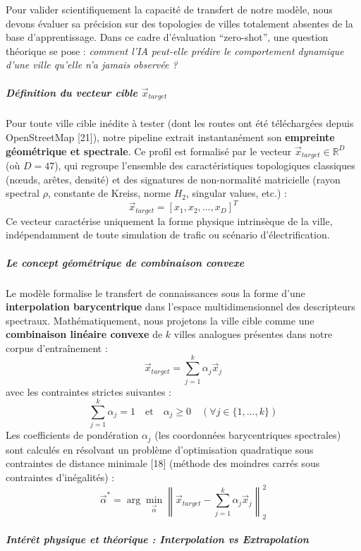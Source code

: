 \documentclass[10pt, a4paper]{article}
\begin{document}
Pour valider scientifiquement la capacité de transfert de notre modèle,
nous devons évaluer sa précision sur des topologies de villes totalement
absentes de la base d'apprentissage. Dans ce cadre d'évaluation
``zero-shot'', une question théorique se pose : \emph{comment l'IA
peut-elle prédire le comportement dynamique d'une ville qu'elle n'a
jamais observée ?}

\subparagraph{\texorpdfstring{Définition du vecteur cible
\(\vec{x}_{target}\)}{Définition du vecteur cible \textbackslash vec\{x\}\_\{target\}}}\label{duxe9finition-du-vecteur-cible-vecx_target}

Pour toute ville cible inédite à tester (dont les routes ont été
téléchargées depuis OpenStreetMap {[}21{]}), notre pipeline extrait
instantanément son \textbf{empreinte géométrique et spectrale}. Ce
profil est formalisé par le vecteur
\(\vec{x}_{target} \in \mathbb{R}^D\) (où \(D = 47\)), qui regroupe
l'ensemble des caractéristiques topologiques classiques (nœuds, arêtes,
densité) et des signatures de non-normalité matricielle (rayon spectral
\(\rho\), constante de Kreiss, norme \(H_2\), singular values, etc.) :
\[\vec{x}_{target} = [x_1, x_2, \dots, x_D]^T\] Ce vecteur caractérise
uniquement la forme physique intrinsèque de la ville, indépendamment de
toute simulation de trafic ou scénario d'électrification.

\subparagraph{Le concept géométrique de combinaison
convexe}\label{le-concept-guxe9omuxe9trique-de-combinaison-convexe}

Le modèle formalise le transfert de connaissances sous la forme d'une
\textbf{interpolation barycentrique} dans l'espace multidimensionnel des
descripteurs spectraux. Mathématiquement, nous projetons la ville cible
comme une \textbf{combinaison linéaire convexe} de \(k\) villes
analogues présentes dans notre corpus d'entraînement :
\[\vec{x}_{target} = \sum_{j=1}^k \alpha_j \vec{x}_j\] avec les
contraintes strictes suivantes :
\[\sum_{j=1}^k \alpha_j = 1 \quad \text{et} \quad \alpha_j \ge 0 \quad (\forall j \in \{1, \dots, k\})\]
Les coefficients de pondération \(\alpha_j\) (les coordonnées
barycentriques spectrales) sont calculés en résolvant un problème
d'optimisation quadratique sous contraintes de distance minimale
{[}18{]} (méthode des moindres carrés sous contraintes d'inégalités) :
\[\vec{\alpha}^* = \arg\min_{\vec{\alpha}} \left\| \vec{x}_{target} - \sum_{j=1}^k \alpha_j \vec{x}_j \right\|_2^2\]

\subparagraph{Intérêt physique et théorique : Interpolation vs
Extrapolation}\label{intuxe9ruxeat-physique-et-thuxe9orique-interpolation-vs-extrapolation}
\end{document}
